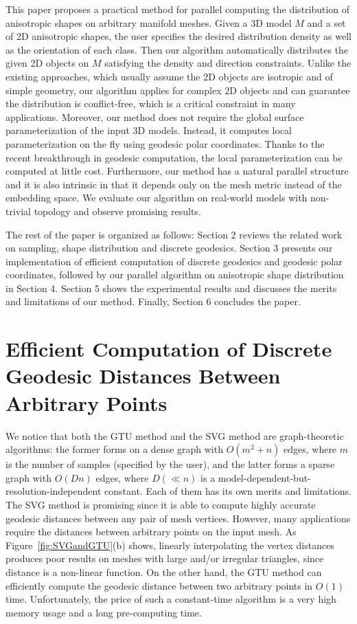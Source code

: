   This paper proposes a practical method for parallel computing the distribution of anisotropic shapes on arbitrary manifold meshes.
  Given a 3D model $M$ and a set of 2D anisotropic shapes, the user specifies the desired distribution density as well as the orientation of each class.
  Then our algorithm automatically distributes the given 2D objects on $M$ satisfying the density and direction constraints.
  Unlike the existing approaches, which usually assume the 2D objects are isotropic and of simple geometry,
  our algorithm applies for complex 2D objects and can guarantee the distribution is conflict-free,
  which is a critical constraint in many applications.
  Moreover, our method does not require the global surface parameterization of the input 3D models.
  Instead, it computes local parameterization on the fly using geodesic polar coordinates.
  Thanks to the recent breakthrough in geodesic computation, the local parameterization can be computed at little cost.
  Furthermore, our method has a natural parallel structure and
  it is also intrinsic in that it depends only on the mesh metric instead of the embedding space.
  We evaluate our algorithm on real-world models with non-trivial topology and observe promising results.

  The rest of the paper is organized as follows:
  Section 2 reviews the related work on sampling, shape distribution and discrete geodesics.
  Section 3 presents our implementation of efficient computation of discrete geodesics and geodesic polar coordinates,
  followed by our parallel algorithm on anisotropic shape distribution in Section 4.
  Section 5 shows the experimental results and discusses the merits and limitations of our method.
  Finally, Section 6 concludes the paper.



\section{Efficient Computation of Discrete Geodesic Distances Between Arbitrary Points}

  We notice that both the GTU method and the SVG method are graph-theoretic algorithms:
  the former forms on a dense graph with $O(m^2+n)$ edges, where $m$ is the number of samples (specified by the user),
  and the latter forms a sparse graph with $O(Dn)$ edges, where $D (\ll n)$ is a model-dependent-but-resolution-independent constant.
  Each of them has its own merits and limitations.
  The SVG method is promising since it is able to compute highly accurate geodesic distances between any pair of mesh vertices.
  However, many applications require the distances between arbitrary points on the input mesh.
  As Figure~\ref{fig:SVGandGTU}(b) shows, linearly interpolating the vertex distances produces poor results on meshes with large and/or irregular triangles,
  since distance is a non-linear function.
  On the other hand, the GTU method can efficiently compute the geodesic distance between two arbitrary points in $O(1)$ time.
  Unfortunately, the price of such a constant-time algorithm is a very high memory usage and a long pre-computing time.

